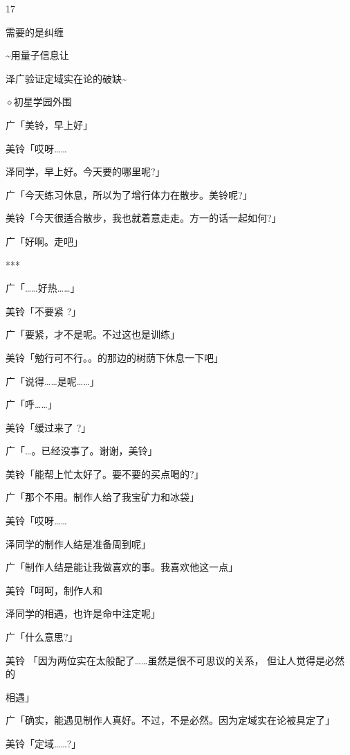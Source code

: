 17\par
需要的是纠缠\par
\textasciitilde{}用量子信息让\par
泽广验证定域实在论的破缺\textasciitilde{}\par
$\diamond$初星学园外围\par
广「美铃，早上好」\par
美铃「哎呀……\par
泽同学，早上好。今天要的哪里呢?」\par
广「今天练习休息，所以为了增行体力在散步。美铃呢?」\par
美铃「今天很适合散步，我也就着意走走。方一的话一起如何?」\par
广「好啊。走吧」\par
***\par
广「……好热……」\par
美铃「不要紧 ?」\par
广「要紧，才不是呢。不过这也是训练」\par
美铃「勉行可不行。。的那边的树荫下休息一下吧」\par
广「说得……是呢……」\par
广「呼……」\par
美铃「缓过来了 ?」\par
广「…。已经没事了。谢谢，美铃」\par
美铃「能帮上忙太好了。要不要的买点喝的?」\par
广「那个不用。制作人给了我宝矿力和冰袋」\par
美铃「哎呀……\par
泽同学的制作人结是准备周到呢」\par
广「制作人结是能让我做喜欢的事。我喜欢他这一点」\par
美铃「呵呵，制作人和\par
泽同学的相遇，也许是命中注定呢」\par
广「什么意思?」\par
美铃 「因为两位实在太般配了……虽然是很不可思议的关系， 但让人觉得是必然的\par
相遇」\par
广「确实，能遇见制作人真好。不过，不是必然。因为定域实在论被具定了」\par
美铃「定域……?」\par

